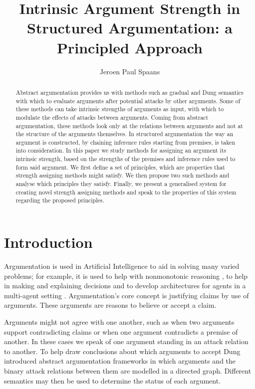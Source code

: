 \documentclass[runningheads]{llncs}
\begin{document}
%
\title{Intrinsic Argument Strength in Structured Argumentation: a Principled Approach}
%
\author{Jeroen Paul Spaans}
%
%
%
\maketitle
%
\begin{abstract}
Abstract argumentation provides us with methods such as gradual and Dung semantics with which to evaluate arguments after potential attacks by other arguments. Some of these methods can take intrinsic strengths of arguments as input, with which to modulate the effects of attacks between arguments. Coming from abstract argumentation, these methods look only at the relations between arguments and not at the structure of the arguments themselves. In structured argumentation the way an argument is constructed, by chaining inference rules starting from premises, is taken into consideration. In this paper we study methods for assigning an argument its intrinsic strength, based on the strengths of the premises and inference rules used to form said argument. We first define a set of principles, which are properties that strength assigning methods might satisfy. We then propose two such methods and analyse which principles they satisfy. Finally, we present a generalised system for creating novel strength assigning methods and speak to the properties of this system regarding the proposed principles.
\end{abstract}
%
%
%
\section{Introduction}
Argumentation is used in Artificial Intelligence to aid in solving many varied problems; for example, it is used to help with nonmonotonic reasoning \cite{DBLP:journals/ai/Dung95}, to help in making and explaining decisions \cite{DBLP:journals/eswa/ZhongFLT19} and to develop architectures for agents in a multi-agent setting \cite{DBLP:conf/argmas/KakasAKMM11}. Argumentation's core concept is justifying claims by use of arguments. These arguments are reasons to believe or accept a claim.

Arguments might not agree with one another, such as when two arguments support contradicting claims or when one argument contradicts a premise of another. In these cases we speak of one argument standing in an attack relation to another. To help draw conclusions about which arguments to accept  Dung introduced abstract argumentation frameworks \cite{DBLP:journals/ai/Dung95} in which arguments and the binary attack relations between them are modelled in a directed graph. Different semantics may then be used to determine the status of each argument.
\end{document}
